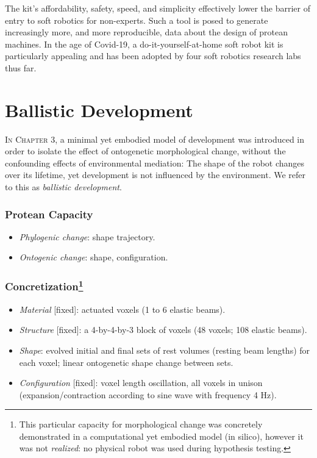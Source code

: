 The kit's affordability, safety, speed, and simplicity effectively lower the barrier of entry to soft robotics for non-experts.
Such a tool is posed to generate increasingly more, and more reproducible, data about the design of protean machines.
In the age of Covid-19, a do-it-yourself-at-home soft robot kit 
is particularly appealing and has been adopted by four soft robotics research labs thus far.



\section{Ballistic Development}


\textsc{In Chapter 3,}
a minimal yet embodied model of development was introduced in order to isolate the effect of ontogenetic morphological change,
without the confounding effects of environmental mediation:
The shape of the
robot changes over its lifetime, yet development is not influenced
by the environment.
We refer to this as \textit{ballistic development}.


\subsubsection*{Protean Capacity}

\begin{itemize}
    \item \textit{Phylogenic change}: shape trajectory.
    \item \textit{Ontogenic change}: shape, configuration.
\end{itemize}

\subsubsection*{Concretization\footnote{This particular capacity for morphological change was concretely demonstrated in a computational yet embodied model (in silico), however it was not \textit{realized}: no physical robot was used during hypothesis testing.}}

\begin{itemize}
    \item \textit{Material} [fixed]: actuated voxels (1 to 6 elastic beams).
    \item \textit{Structure} [fixed]: a 4-by-4-by-3 block of voxels (48 voxels; 108 elastic beams).
    \item \textit{Shape}: evolved initial and final sets of rest volumes (resting beam lengths) for each voxel; linear ontogenetic shape change between sets.
    \item \textit{Configuration} [fixed]: voxel length oscillation, all voxels in unison (expansion/contraction according to sine wave with frequency 4 Hz).
\end{itemize}


